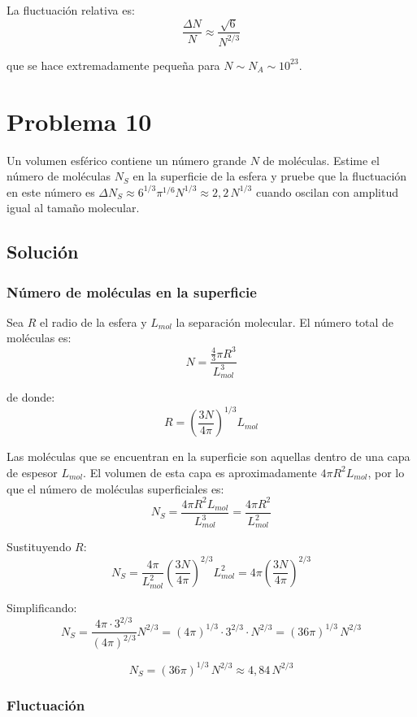\documentclass[a4paper]{article}
\begin{document}
La fluctuación relativa es:
$$
\frac{\Delta N}{N} \approx \frac{\sqrt{6}}{N^{2/3}}
$$

que se hace extremadamente pequeña para $N \sim N_A \sim 10^{23}$.

\section{Problema 10}
Un volumen esférico contiene un número grande $N$ de moléculas. Estime el número de moléculas $N_S$ en la superficie de la esfera y pruebe que la fluctuación en este número es $\Delta N_S \approx 6^{1/3}\pi^{1/6}N^{1/3} \approx 2{,}2\, N^{1/3}$ cuando oscilan con amplitud igual al tamaño molecular.

\subsection{Solución}

\subsubsection{Número de moléculas en la superficie}

Sea $R$ el radio de la esfera y $L_{mol}$ la separación molecular. El número total de moléculas es:
$$
N = \frac{\frac{4}{3}\pi R^3}{L_{mol}^3}
$$

de donde:
$$
R = \left(\frac{3N}{4\pi}\right)^{1/3} L_{mol}
$$

Las moléculas que se encuentran en la superficie son aquellas dentro de una capa de espesor $L_{mol}$. El volumen de esta capa es aproximadamente $4\pi R^2 L_{mol}$, por lo que el número de moléculas superficiales es:
$$
N_S = \frac{4\pi R^2 L_{mol}}{L_{mol}^3} = \frac{4\pi R^2}{L_{mol}^2}
$$

Sustituyendo $R$:
$$
N_S = \frac{4\pi}{L_{mol}^2}\left(\frac{3N}{4\pi}\right)^{2/3} L_{mol}^2 = 4\pi\left(\frac{3N}{4\pi}\right)^{2/3}
$$

Simplificando:
$$
N_S = \frac{4\pi \cdot 3^{2/3}}{(4\pi)^{2/3}} N^{2/3} = (4\pi)^{1/3}\cdot 3^{2/3}\cdot N^{2/3} = (36\pi)^{1/3}\, N^{2/3}
$$

$$
\boxed{N_S = (36\pi)^{1/3}\, N^{2/3} \approx 4{,}84\, N^{2/3}}
$$

\subsubsection{Fluctuación}
\end{document}
